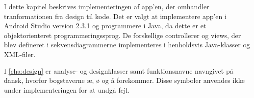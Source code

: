 I dette kapitel beskrives implementeringen af app'en, der omhandler tranformationen fra design til kode. Det er valgt at implementere app'en i Android Studio version 2.3.1 og programmere i Java, da dette er et objektorienteret programmeringssprog. De forskellige controllerer og views, der blev defineret i sekvensdiagrammerne implementeres i henholdsvis Java-klasser og XML-filer. 

I \autoref{cha:design} er analyse- og designklasser samt funktionsnavne navngivet på dansk, hvorfor bogstaverne æ, ø og å forekommer. Disse symboler anvendes ikke under implementeringen for at undgå fejl.